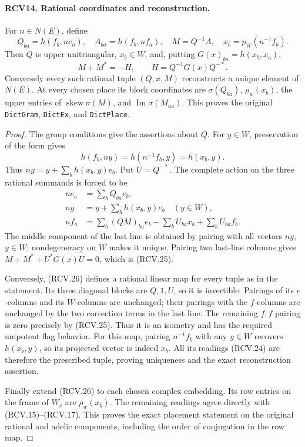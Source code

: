 \paragraph{RCV14. Rational coordinates and reconstruction.}
\label{claim:RCV14}
For \(n\in N(E)\), define
\[
 Q_{ba}=h(f_b,ne_a),\quad A_{ba}=h(f_b,nf_a),\quad
 M=Q^{-1}A,\quad x_b=p_W(n^{-1}f_b).
\tag{RCV.24}
\]
Then \(Q\) is upper unitriangular, \(x_b\in W\), and, putting
\(G(x)_{ba}=h(x_b,x_a)\),
\[
               M+M^*=-H,\qquad H=Q^{-1}G(x)Q^{-*}.
\tag{RCV.25}
\]
Conversely every such rational tuple \((Q,x,M)\) reconstructs a
unique element of \(N(E)\).  At every chosen place its block
coordinates are \(\sigma(Q_{ba})\), \(\rho_w(x_b)\), the
upper entries of \(\operatorname{skew}\sigma(M)\), and
\(\operatorname{Im}\sigma(M_{aa})\).
This proves the original \texttt{DictGram}, \texttt{DictEx}, and
\texttt{DictPlace}.
\begin{proof}
The group conditions give the assertions about \(Q\).  For
\(y\in W\), preservation of the form gives
\[
 h(f_b,ny)=h(n^{-1}f_b,y)=h(x_b,y).
\]
Thus \(ny=y+\sum_bh(x_b,y)e_b\).  Put \(U=Q^{-*}\).
The complete action on the three rational summands is forced to be
\[
 \begin{split}
 ne_a&=\sum_b Q_{ba}e_b,\\
 ny&=y+\sum_b h(x_b,y)e_b\quad(y\in W),\\
 nf_a&=\sum_b(QM)_{ba}e_b
                         -\sum_b U_{ba}x_b+\sum_b U_{ba}f_b.
 \end{split}
\tag{RCV.26}
\]
The middle component of the last line is obtained by pairing with
all vectors \(ny\), \(y\in W\); nondegeneracy on \(W\)
makes it unique.  Pairing two last-line columns gives
\(M+M^*+U^*G(x)U=0\), which is (RCV.25).

Conversely, (RCV.26) defines a rational linear map for every tuple
as in the statement.  Its three diagonal blocks are \(Q,1,U\),
so it is invertible.  Pairings of its \(e\)-columns and its
\(W\)-columns are unchanged; their pairings with the \(f\)-columns
are unchanged by the two correction terms in the last line.
The remaining \(f,f\) pairing is zero precisely by (RCV.25).
Thus it is an isometry and has the required unipotent flag behavior.
For this map, pairing \(n^{-1}f_b\) with any \(y\in W\)
recovers \(h(x_b,y)\), so its projected vector is indeed \(x_b\).
All its readings (RCV.24) are therefore the prescribed tuple, proving
uniqueness and the exact reconstruction assertion.

Finally extend (RCV.26) to each chosen complex embedding.  Its row
entries on the frame of \(W_v\) are \(\rho_w(x_b)\).
The remaining readings agree directly with (RCV.15)--(RCV.17).
This proves the exact placement statement on the original rational
and adelic components, including the order of conjugation in the
row map.
\end{proof}

